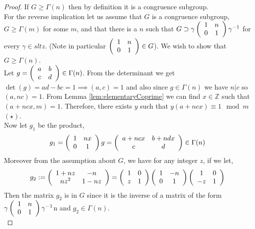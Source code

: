 \begin{proof}
If $G \geq \Gamma(n)$ then by definition it is a congruence subgroup. \\
For the reverse implication let us assume that $G$ is a congruence subgroup, $G \geq \Gamma(m)$ for some $m$, and that there is a $n$ such that $G \supset \gamma \left(\begin{array}{ c c } 1 & n \\ 0 & 1 \end{array} \right) \gamma^{-1}$ for every $\gamma \in sltz$. (Note in particular $\left(\begin{array}{ c c } 1 & n \\ 0 & 1 \end{array} \right) \in G$).
We wish to show that $G \geq \Gamma(n)$. \\
Let $g = \left(\begin{array}{ c c } a & b \\ c & d \end{array} \right) \in \Gamma(n)$. From the determinant we get $\det(g) = ad -bc = 1 \implies (a,c) =1$ and also since $g \in \Gamma(n)$ we have $n \vert c$ so $(a,nc) =1$. From Lemma \ref{lem:elementaryCoprime} we can find $x \in \mathbb{Z}$ such that $(a + ncx,m) = 1$. Therefore, there exists $y$ such that $y(a + ncx) \equiv 1 \mod m$ $(\star)$. \\
Now let $g_1$ be the product, 
$$g_1 = \left(\begin{array}{ c c } 1 & nx \\ 0 & 1 \end{array} \right)g =  \left(\begin{array}{ c c } a + ncx & b+ndx \\ c & d \end{array} \right) \in \Gamma(n)$$
Moreover from the assumption about $G$, we have for any integer $z$, if we let,
$$g_2 := \left(\begin{array}{ c c } 1 +nz & -n \\ nz^2 & 1-nz \end{array} \right) = \left(\begin{array}{ c c } 1 & 0 \\ z & 1 \end{array} \right) \left(\begin{array}{ c c } 1 & -n \\ 0 & 1 \end{array} \right)\left(\begin{array}{ c c } 1 & 0 \\ -z & 1 \end{array} \right) $$
Then the matrix $g_2$ is in $G$ since it is the inverse of a matrix of the form $\gamma  \left(\begin{array}{ c c } 1 & n \\ 0 & 1 \end{array} \right) \gamma^{-1}$n and $g_2 \in \Gamma(n)$.\\

\end{proof}
